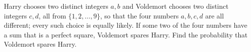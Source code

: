 Harry chooses two distinct integers $a,b$ and Voldemort chooses two distinct integers $c,d$, all from $\{1,2,\dots,9\}$, so that the four numbers $a,b,c,d$ are all different; every such choice is equally likely. If some two of the four numbers have a sum that is a perfect square, Voldemort spares Harry. Find the probability that Voldemort spares Harry.
